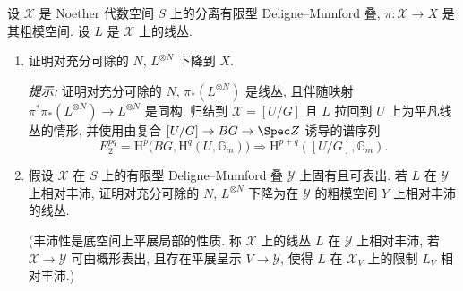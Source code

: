 \begin{exercise}\label{src:5.4.29}
设 $\mathcal X$ 是 Noether 代数空间 $S$ 上的分离有限型 Deligne--Mumford 叠, $\pi:\mathcal X\to X$ 是其粗模空间. 设 $L$ 是 $\mathcal X$ 上的线丛.
\begin{enumerate}[(1)]
\item 证明对充分可除的 $N$, $L^{\otimes N}$ 下降到 $X$.

\textit{提示:} 证明对充分可除的 $N$, $\pi_*(L^{\otimes N})$ 是线丛, 且伴随映射 $\pi^*\pi_*(L^{\otimes N})\to L^{\otimes N}$ 是同构. 归结到 $\mathcal X=[U/G]$ 且 $L$ 拉回到 $U$ 上为平凡线丛的情形, 并使用由复合 $[U/G]\to BG\to\Spec\mathbb Z$ 诱导的谱序列
\[
E_2^{pq}=\mathrm H^p\bigl(BG,\mathrm H^q(U,\mathbb G_m)\bigr)\Longrightarrow\mathrm H^{p+q}([U/G],\mathbb G_m).
\]
\item 假设 $\mathcal X$ 在 $S$ 上的有限型 Deligne--Mumford 叠 $\mathcal Y$ 上固有且可表出. 若 $L$ 在 $\mathcal Y$ 上相对丰沛, 证明对充分可除的 $N$, $L^{\otimes N}$ 下降为在 $\mathcal Y$ 的粗模空间 $Y$ 上相对丰沛的线丛.

(丰沛性是底空间上平展局部的性质. 称 $\mathcal X$ 上的线丛 $L$ 在 $\mathcal Y$ 上相对丰沛, 若 $\mathcal X\to\mathcal Y$ 可由概形表出, 且存在平展呈示 $V\to\mathcal Y$, 使得 $L$ 在 $\mathcal X_V$ 上的限制 $L_V$ 相对丰沛.)
\end{enumerate}
\end{exercise}
